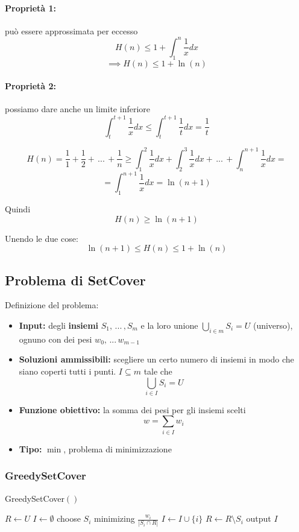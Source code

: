 \paragraph{Proprietà 1:}  può essere approssimata per eccesso
$$ H(n) \leq 1 + \int_1^n \frac{1}{x} dx$$
$$ \implies H(n) \leq 1 + \ln (n) $$

\paragraph{Proprietà 2:} possiamo dare anche un limite inferiore
$$ \int_t^{t+1} \frac{1}{x} dx \leq \int_t^{t+1} \frac{1}{t} dx = \frac{1}{t} $$

$$ H(n) = \frac{1}{1} + \frac{1}{2} + \, ... \, + \frac{1}{n} \geq \int_{1}^{2} \frac{1}{x} dx + \int_{2}^{3} \frac{1}{x} dx + \, ... \, + \int_{n}^{n+1} \frac{1}{x} dx =$$
$$ = \int_1^{n+1} \frac{1}{x} dx = \ln(n+1)$$

Quindi 
$$ H(n) \geq \ln(n+1) $$

Unendo le due cose:
$$ \ln (n+1) \leq H(n) \leq 1 + \ln(n) $$

\newpage

\subsection{Problema di SetCover}
\label{subsec:setcover}
Definizione del problema:
\begin{itemize}
	\item \textbf{Input:} degli \textbf{insiemi} $S_1, \, ... \, , S_m$ e la loro unione $\bigcup_{i \in m} S_i = U$ (universo), ognuno con dei pesi $w_0, \, ... \, w_{m-1}$
	
	\item \textbf{Soluzioni ammissibili:} scegliere un certo numero di insiemi in modo che siano coperti tutti i punti. $I \subseteq m$ tale che
	$$ \bigcup_{i \in I} S_i = U $$
	
	\item \textbf{Funzione obiettivo:} la somma dei pesi per gli insiemi scelti
	$$ w = \sum_{i \in I} w_i $$
	
	\item \textbf{Tipo:} $\min$, problema di minimizzazione
\end{itemize}

\subsubsection{GreedySetCover}
\begin{algorithm}
	\caption{GreedySetCover$()$}
	\begin{algorithmic}
		\STATE $R \leftarrow U$
		\STATE $I \leftarrow \emptyset$
		\STATE choose $S_i$ minimizing $\frac{w_i}{|S_i \cap R|}$
		\STATE $I \leftarrow I \cup \{i\}$
		\STATE $R \leftarrow R \setminus S_i$
		\ENDWHILE
		\STATE output $I$
	\end{algorithmic}
\end{algorithm}

